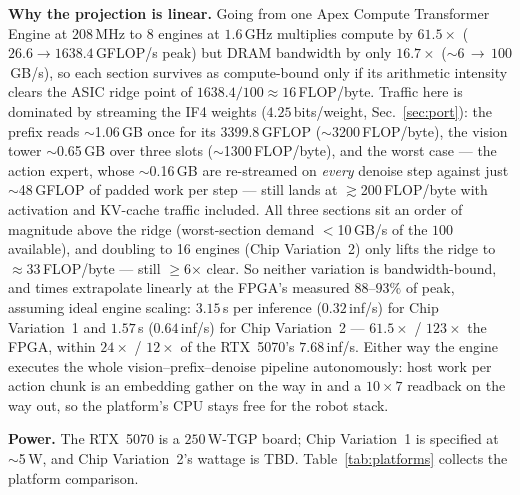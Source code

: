 \documentclass[11pt]{article}
\newcommand{\iffour}{IF4}
\begin{document}
\vspace{2pt}
\noindent\textbf{Why the projection is linear.} Going from one Apex Compute
Transformer Engine at
$208$\,MHz to 8 engines at $1.6$\,GHz multiplies compute by $61.5\times$
($26.6\!\to\!1638.4$\,GFLOP/s peak) but DRAM bandwidth by only $16.7\times$
($\sim$6\,$\to$\,$100$\,GB/s), so each section survives as compute-bound only
if its arithmetic intensity clears the ASIC ridge point of
$1638.4/100\approx16$\,FLOP/byte. Traffic here is dominated by streaming the
\iffour{} weights ($4.25$\,bits/weight, Sec.~\ref{sec:port}): the prefix
reads $\sim$1.06\,GB once
for its 3399.8\,GFLOP ($\sim$3200\,FLOP/byte), the vision tower $\sim$0.65\,GB
over three slots ($\sim$1300\,FLOP/byte), and the worst case --- the action
expert, whose $\sim$0.16\,GB are re-streamed on \emph{every} denoise step
against just $\sim$48\,GFLOP of padded work per step --- still lands at
$\gtrsim$200\,FLOP/byte with activation and KV-cache traffic included. All
three sections sit an order of magnitude above the ridge (worst-section
demand $<$10\,GB/s of the $100$ available), and doubling to 16 engines
(Chip Variation~2) only
lifts the ridge to $\approx$33\,FLOP/byte --- still $\geq$6$\times$ clear. So
neither variation is bandwidth-bound, and times extrapolate linearly at the
FPGA's measured $88$--$93\%$ of peak, assuming ideal engine scaling:
$3.15$\,s per inference ($0.32$\,inf/s) for Chip Variation~1 and $1.57$\,s
($0.64$\,inf/s) for Chip Variation~2 --- $61.5\times$ / $123\times$ the FPGA, within
$24\times$ / $12\times$ of the RTX~5070's $7.68$\,inf/s. Either way the
engine executes the whole vision--prefix--denoise pipeline autonomously:
host work per action chunk is an embedding gather on the way in and a
$10{\times}7$ readback on the way out, so the platform's CPU stays free for
the robot stack.

\vspace{2pt}
\noindent\textbf{Power.} The RTX~5070 is a $250$\,W-TGP board; Chip
Variation~1 is specified at $\sim$5\,W, and Chip Variation~2's wattage is
TBD. Table~\ref{tab:platforms} collects the platform comparison.
\end{document}
